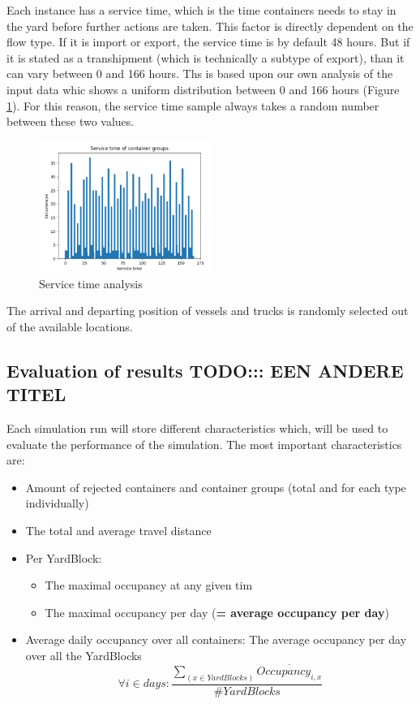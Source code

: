 \documentclass[]{article}
\begin{document}
Each instance has a service time, which is the time containers needs to stay in
the yard before further actions are taken. This factor is directly dependent on
the flow type. If it is import or export, the service time is by default 48
hours. But if it is stated as a transhipment (which is technically a subtype of
export), than it can vary between 0 and 166 hours. Ths is based upon our own
analysis of the input data whic shows a uniform distribution between 0 and 166
hours (Figure \ref{fig: service time analysis}). For this reason, the service
time sample always takes a random number between these two values.
\begin{figure}
	\centering
	\includegraphics[width=0.5\textwidth]{Afbeeldingen/service time analysis.png}
	\caption{Service time analysis}
	\label{fig: service time analysis}
\end{figure}

The arrival and departing position of vessels and trucks is randomly selected
out of the available locations.

\subsection{Evaluation of results \Large TODO::: EEN ANDERE TITEL}
Each simulation run will store different characteristics which, will be used to
evaluate the performance of the simulation. The most important characteristics
are: \begin{itemize}
	\item Amount of rejected containers and container groups (total and for each type
	      individually)
	\item The total and average travel distance
	\item Per YardBlock:
	      \begin{itemize}
		      \item The maximal occupancy at any given tim
		      \item The maximal occupancy per day (\textbf{= average occupancy per day})
	      \end{itemize}
	\item Average daily occupancy over all containers: The average occupancy per day over
	      all the YardBlocks \[\forall i \in days: \frac{\sum_{(x \in YardBlocks)}
			      \overline{Occupancy_{i,x}}}{\#YardBlocks}\]
\end{itemize}
\end{document}

